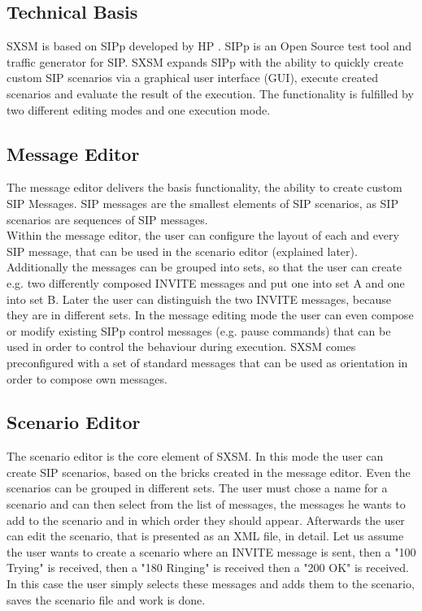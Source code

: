 \documentclass[final
	]{issa}
\begin{document}
\subsection{Technical Basis}
SXSM is based on SIPp developed by HP \cite{homepage:sipp}. SIPp is an Open Source test tool and traffic generator for SIP. SXSM expands SIPp with the ability to quickly create custom SIP scenarios via a graphical user interface (GUI), execute created scenarios and evaluate the result of the execution. The functionality  is fulfilled by two different editing modes and one execution mode.
\subsection{Message Editor}
The message editor delivers the basis functionality, the ability to create custom SIP Messages. SIP messages are the smallest elements of SIP scenarios, as SIP scenarios are sequences of SIP messages.\\ Within the message editor, the user can configure the layout of each and every SIP message, that can be used in the scenario editor (explained later). Additionally the messages can be grouped into sets, so that the user can create e.g. two differently composed INVITE messages and put one into set A and one into set B. Later the user can distinguish the two INVITE messages, because they are in different sets. In the message editing mode the user can even compose or modify existing SIPp control messages (e.g. pause commands) that can be used in order to control the behaviour during execution. SXSM comes preconfigured  with a set of standard messages that can be used as orientation in order to compose own messages.
\subsection{Scenario Editor}
The scenario editor is the core element of SXSM. In this mode the user can create SIP scenarios, based on the bricks created in the message editor. Even the scenarios can be grouped in different sets. The user must chose a name for a scenario and can then select from the list of messages, the messages he wants to add to the scenario and in which order they should appear. Afterwards the user can edit the scenario, that is presented as an XML file, in detail. Let us assume the user wants to create a scenario where an INVITE message is sent, then a "100 Trying" is received, then a "180 Ringing" is received then a "200 OK" is received. In this case the user simply selects these messages and adds them to the scenario, saves the scenario file and work is done.
\end{document}
